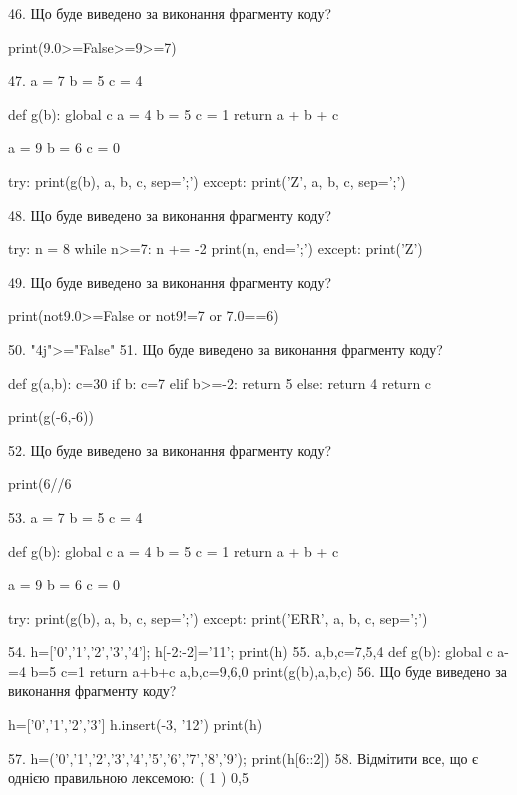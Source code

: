 \documentclass[11pt]{article}
\begin{document}
46. Що буде виведено за виконання фрагменту коду?

print(9.0>=False>=9>=7)

47. 
a = 7
b = 5
c = 4

def g(b):
global c    a = 4
    b = 5
    c = 1
    return a + b + c

a = 9
b = 6
c = 0

try:
    print(g(b), a, b, c, sep=';')
except:
    print('Z', a, b, c, sep=';')

48. Що буде виведено за виконання фрагменту коду?

try:
    n = 8
    while n>=7:
        n += -2
    print(n, end=';')
except:
    print('Z')


49. Що буде виведено за виконання фрагменту коду?

print(not9.0>=False or not9!=7 or 7.0==6)

50. 
"4j">="False"
51. Що буде виведено за виконання фрагменту коду?

def g(a,b):
    c=30
    if b:
        c=7
    elif b>=-2:
         return 5
    else: 
        return 4
    return c

print(g(-6,-6))

52. Що буде виведено за виконання фрагменту коду?

print(6//6%

53. 
a = 7
b = 5
c = 4

def g(b):
global c    a = 4
    b = 5
    c = 1
    return a + b + c

a = 9
b = 6
c = 0

try:
    print(g(b), a, b, c, sep=';')
except:
    print('ERR', a, b, c, sep=';')

54. 
h=['0','1','2','3','4']; h[-2:-2]='11'; print(h)
55. 
a,b,c=7,5,4
    def g(b):
      global c      a-=4
      b=5
      c=1
      return a+b+c
    a,b,c=9,6,0
    print(g(b),a,b,c)
56. Що буде виведено за виконання фрагменту коду?

h=['0','1','2','3']
h.insert(-3, '12')
print(h)


57. 
h=('0','1','2','3','4','5','6','7','8','9'); print(h[6::2])
58. %
Відмітити все, що є однією правильною лексемою:
( 1 ) 0,5
\end{document}
